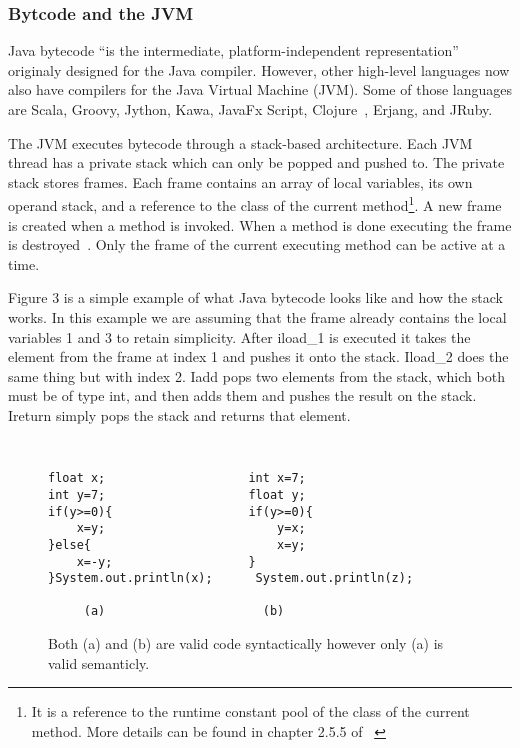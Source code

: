 \documentclass{sig-alternate}
\begin{document}
\subsubsection{ Bytcode and the JVM}
Java bytecode ``is the intermediate, platform-independent representation''~\cite{FINCH2:2009} originaly designed for the Java compiler. However, other high-level languages now also have compilers for the Java Virtual Machine (JVM). Some of those languages are Scala, Groovy, Jython, Kawa, JavaFx Script, Clojure~\cite{FINCH:2011}, Erjang, and JRuby.

The JVM executes bytecode through a stack-based architecture. Each JVM thread has a private stack which can only be popped and pushed to. The private stack stores frames. Each frame contains an array of local variables, its own operand stack, and a reference to the class of the current method\footnote{It is a reference to the runtime constant pool of the class of the current method. More details can be found in chapter 2.5.5 of ~\cite{JVMspec:2013}}. A new frame is created when a method is invoked. When a method is done executing the frame is destroyed~\cite{Oracle:2013}. Only the frame of the current executing method can be active at a time.

Figure 3 is a simple example of what Java bytecode looks like and how the stack works. In this example we are assuming that the frame already contains the local variables 1 and 3 to retain simplicity. After iload\_1 is executed it takes the element from the frame at index 1 and pushes it onto the stack. Iload\_2 does the same thing but with index 2. Iadd pops two elements from the stack, which both must be of type int, and then adds them and pushes the result on the stack. Ireturn simply pops the stack and returns that element. 

\begin{figure}
\centering
{\tt
\begin{verbatim}
float x;                    int x=7;
int y=7;                    float y;
if(y>=0){                   if(y>=0){
    x=y;                        y=x;
}else{                          x=y;
    x=-y;                   }
}System.out.println(x);      System.out.println(z);	
     
     (a)                      (b)

\end{verbatim}
}
\caption{Both (a) and (b) are valid code syntactically however only (a) is valid semanticly.}
\end{figure}
\end{document}
